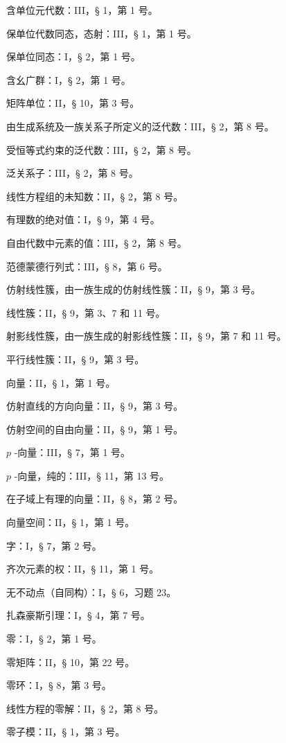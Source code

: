 含单位元代数：III，§ 1，第 1 号。

保单位代数同态，态射：III，§ 1，第 1 号。

保单位同态：I，§ 2，第 1 号。

含幺广群：I，§ 2，第 1 号。

矩阵单位：II，§ 10，第 3 号。

由生成系统及一族关系子所定义的泛代数：III，§ 2，第 8 号。

受恒等式约束的泛代数：III，§ 2，第 8 号。

泛关系子：III，§ 2，第 8 号。

线性方程组的未知数：II，§ 2，第 8 号。

有理数的绝对值：I，§ 9，第 4 号。

自由代数中元素的值：III，§ 2，第 8 号。

范德蒙德行列式：III，§ 8，第 6 号。

仿射线性簇，由一族生成的仿射线性簇：II，§ 9，第 3 号。

线性簇：II，§ 9，第 3、7 和 11 号。

射影线性簇，由一族生成的射影线性簇：II，§ 9，第 7 和 11 号。

平行线性簇：II，§ 9，第 3 号。

向量：II，§ 1，第 1 号。

仿射直线的方向向量：II，§ 9，第 3 号。

仿射空间的自由向量：II，§ 9，第 1 号。

\(p\) -向量：III，§ 7，第 1 号。

\(p\) -向量，纯的：III，§ 11，第 13 号。

在子域上有理的向量：II，§ 8，第 2 号。

向量空间：II，§ 1，第 1 号。

字：I，§ 7，第 2 号。

齐次元素的权：II，§ 11，第 1 号。

无不动点（自同构）：I，§ 6，习题 23。

扎森豪斯引理：I，§ 4，第 7 号。

零：I，§ 2，第 1 号。

零矩阵：II，§ 10，第 22 号。

零环：I，§ 8，第 3 号。

线性方程的零解：II，§ 2，第 8 号。

零子模：II，§ 1，第 3 号。
